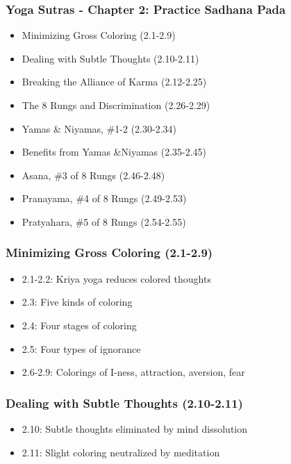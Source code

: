 \begin{frame}[fragile]\frametitle{Yoga Sutras - Chapter 2: Practice Sadhana Pada}
\begin{itemize}
\item Minimizing Gross Coloring (2.1-2.9)
\item Dealing with Subtle Thoughts (2.10-2.11)  
\item Breaking the Alliance of Karma (2.12-2.25)
\item The 8 Rungs and Discrimination (2.26-2.29)
\item Yamas \& Niyamas, \#1-2 (2.30-2.34)
\item Benefits from Yamas \&Niyamas (2.35-2.45)
\item Asana, \#3 of 8 Rungs (2.46-2.48)
\item Pranayama, \#4 of 8 Rungs (2.49-2.53)
\item Pratyahara, \#5 of 8 Rungs (2.54-2.55)
\end{itemize}
\end{frame}

\begin{frame}[fragile]\frametitle{Minimizing Gross Coloring (2.1-2.9)}
\begin{itemize}
\item 2.1-2.2: Kriya yoga reduces colored thoughts
\item 2.3: Five kinds of coloring
\item 2.4: Four stages of coloring 
\item 2.5: Four types of ignorance
\item 2.6-2.9: Colorings of I-ness, attraction, aversion, fear
\end{itemize}
\end{frame}

\begin{frame}[fragile]\frametitle{Dealing with Subtle Thoughts (2.10-2.11)}
\begin{itemize}
\item 2.10: Subtle thoughts eliminated by mind dissolution
\item 2.11: Slight coloring neutralized by meditation  
\end{itemize}
\end{frame}

